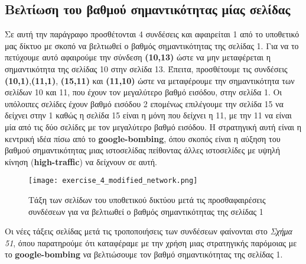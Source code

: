\documentclass[First Project.tex]{subfiles}
\begin{document}
\subsection{ Βελτίωση του βαθμού σημαντικότητας μίας σελίδας }

Σε αυτή την παράγραφο προσθέτονται 4 συνδέσεις και αφαιρείται 1 από το υποθετικό μας δίκτυο με σκοπό να βελτιωθεί ο βαθμός σημαντικότητας της
σελίδας 1. Για να το πετύχουμε αυτό αφαιρούμε την σύνδεση \textbf{(10,13)} ώστε να μην μεταφέρεται
η σημαντικότητα της σελίδας 10 στην σελίδα 13. Έπειτα, προσθέτουμε τις συνδέσεις \textbf{(10,1)},\textbf{(11,1)},
\textbf{(15,11)} και \textbf{(11,10)} ώστε να μεταφέρουμε την σημαντικότητα των σελίδων 10 και 11, που έχουν 
τον μεγαλύτερο βαθμό εισόδου, στην σελίδα 1. Οι υπόλοιπες σελίδες έχουν βαθμό εισόδου 2 επομένως επιλέγουμε την σελίδα 15 να δείχνει στην 1
καθώς η σελίδα 15 είναι η μόνη που δείχνει η 11, με την 11 να είναι μία από τις δύο σελίδες με τον μεγαλύτερο βαθμό εισόδου. Η στρατηγική αυτή 
είναι η κεντρική ιδέα πίσω από το \textlatin{\textbf{google-bombing}}, όπου σκοπός είναι η αύξηση του βαθμού σημαντικότητας μιας 
ιστοσελίδας πείθοντας άλλες ιστοσελίδες με υψηλή κίνηση (\textlatin{\textbf{high-traffic}}) να δείχνουν σε αυτή.

\begin{figure}[h!]
    \centering
    \captionsetup{justification=centering}
    \begin{center}
        \texttt{[image: exercise\_4\_modified\_network.png]}    
        \caption{ Τάξη των σελίδων του υποθετικού δικτύου μετά τις προσθαφαιρέσεις συνδέσεων για να βελτιωθεί 
        ο βαθμός σημαντικότητας της σελίδας 1 }
    \end{center}
\end{figure} 

Οι νέες τάξεις σελίδας μετά τις τροποποιήσεις των συνδέσεων φαίνονται στο \textit{Σχήμα 51}, όπου παρατηρούμε ότι καταφέραμε με την χρήση μιας
στρατηγικής παρόμοιας με το \textlatin{\textbf{google-bombing}} να βελτιώσουμε τον βαθμό σημαντικότητας της σελίδας 1.
\end{document}
